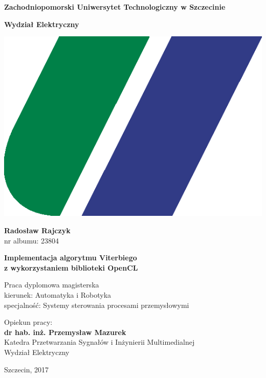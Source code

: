 \documentclass[document.tex]{subfiles}
\begin{document}
\begin{titlepage}

\begin{center}
\huge{\textbf{Zachodniopomorski Uniwersytet Technologiczny w Szczecinie}}

\LARGE{\textbf{Wydział Elektryczny}}

\vspace{0.5cm}
\includegraphics[scale=0.2]{imgs/logoNew.png}

\vspace{1cm}
\Large{\textbf{Radosław Rajczyk}} \\
\large{nr albumu: 23804}

\vspace{1cm}
\Large{\textbf{	Implementacja algorytmu Viterbiego 
\\z wykorzystaniem biblioteki OpenCL  }}

\vspace{1cm}
\large{Praca dyplomowa magisterska \\
kierunek: Automatyka i Robotyka \\
specjalność: Systemy sterowania procesami przemysłowymi}
\end{center}

\vspace{4cm}
\begin{flushright}
\large{Opiekun pracy:\\
\textbf{dr hab. inż. Przemysław Mazurek} \\
Katedra Przetwarzania Sygnałów i Inżynierii Multimedialnej\\
Wydział Elektryczny}
\end{flushright}

\vspace{2cm}
\begin{center}
\Large{Szczecin, 2017}
\end{center}
\end{titlepage}
\end{document}
